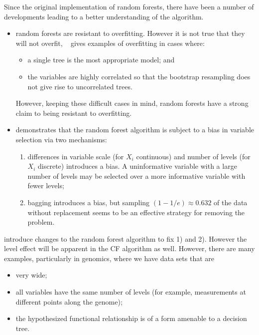 \documentclass[10pt,letterpaper]{article}
\begin{document}
Since the original implementation of random forests, there have been a number of developments leading to a better understanding of
the algorithm. 
\begin{itemize}
\item random forests are resistant to overfitting. However it is not true that they will not overfit,
  ~\cite{Segal.2004} gives examples of overfitting in cases where:
  \begin{itemize}
  \item a single tree is the most appropriate model; and
  \item the variables are highly correlated so that the bootstrap resampling does not give rise to uncorrelated trees.
  \end{itemize}
However, keeping these difficult cases in mind, random forests have a strong claim to being resistant to overfitting.

\item \cite{Strobl.et.al.2007} demonstrates that the random forest algorithm is subject to a bias in variable selection via two mechanisms:
  \begin{enumerate}
  \item differences in variable scale (for $X_i$ continuous) and number of levels (for $X_i$ discrete) introduces a
    bias. A uninformative variable with a large number of levels may be selected over a more informative variable with
    fewer levels;
  \item bagging introduces a bias, but sampling $(1- 1/e) \approx 0.632$ of the data without replacement seems to be an
    effective strategy for removing the problem.
  \end{enumerate}
\end{itemize} 

\cite{Strobl.et.al.2007} introduce changes to the random forest algorithm to fix 1) and 2).  However the level effect will be
apparent in the CF algorithm as well.  However, there are many examples, particularly in genomics, where we have data
sets that are
\begin{itemize}
\item very wide;
\item all variables have the same number of levels (for example, measurements at different points along the genome);
\item the hypothesized functional relationship is of a form amenable to a decision tree.
\end{itemize}
\end{document}

